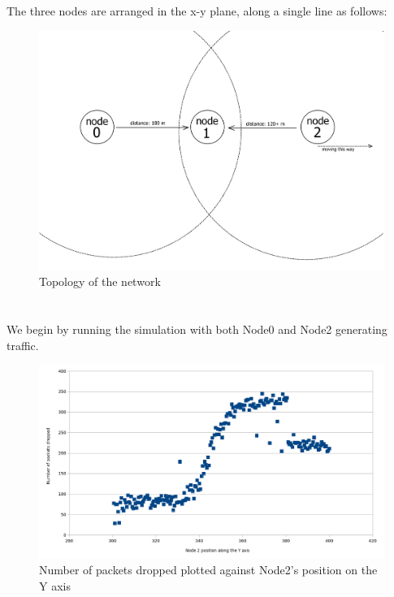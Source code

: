 \documentclass[11pt,journal]{article}
\begin{document}
	\section{}
	The three nodes are arranged in the x-y plane, along a single line as follows:
	\begin{figure}[h]
		\centering
		\includegraphics[scale=0.6]{lab3topology2.png}
		\caption{Topology of the network}
	\end{figure}
\pagebreak
	\section{}
	We begin by running the simulation with both Node0 and Node2 generating traffic.
	\begin{figure}[h]
		\centering
		\includegraphics[scale=0.6]{graph1.png}
		\caption{Number of packets dropped plotted against Node2's position on the Y axis}
	\end{figure}
\end{document}
